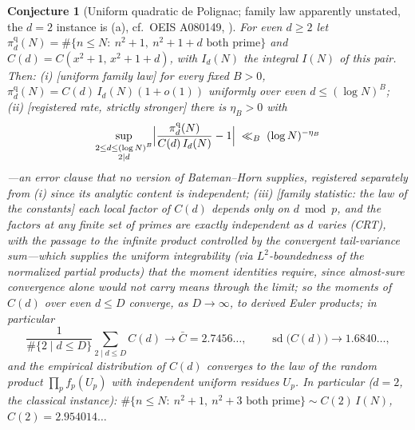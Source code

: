 \documentclass[11pt]{article}
\newtheorem{conjecture}{Conjecture}
\theoremstyle{definition}
\begin{document}
\setcounter{conjecture}{9}%
\begin{conjecture}[Uniform quadratic de Polignac; family law apparently
unstated, the $d=2$ instance is (a), cf.\ OEIS A080149,
\cite{Carella}]\label{c1}
For even $d\ge2$ let
$\pi^{\mathrm q}_d(N)=\#\{n\le N:\ n^2+1,\ n^2+1+d \text{ both
prime}\}$ and $C(d)=C(x^2+1,\,x^2+1+d)$, with $I_d(N)$ the integral $I(N)$ of this pair.  Then:
\emph{(i)} [uniform family law] for every fixed $B>0$,
$\pi^{\mathrm q}_d(N)=C(d)\,I_d(N)(1+o(1))$ uniformly over even
$d\le(\log N)^{B}$;
\emph{(ii)} [registered rate, strictly stronger] there is
$\eta_B>0$ with
\[
\sup_{\substack{2\le d\le(\log N)^{B}\\ 2\mid d}}
\Bigl|\frac{\pi^{\mathrm q}_d(N)}{C(d)\,I_d(N)}-1\Bigr|
\;\ll_B\;(\log N)^{-\eta_B}
\]
---an error clause that no version of Bateman--Horn supplies, registered
separately from (i) since its analytic content is independent;
\emph{(iii)} [family statistic: the law of the constants]
each local factor of $C(d)$ depends only on $d\bmod p$, and the
factors at any \emph{finite} set of primes are exactly independent
as $d$ varies (CRT), with the passage to the infinite product
controlled by the convergent tail-variance sum---which supplies the
uniform integrability (via $L^2$-boundedness of the normalized
partial products) that the moment identities require, since
almost-sure convergence alone would not carry means through the
limit; so the moments of
$C(d)$ over even $d\le D$ converge, as $D\to\infty$, to
\emph{derived} Euler products; in particular
\[
\frac1{\#\{2\mid d\le D\}}\sum_{2\mid d\le D}C(d)\to\bar C=2.7456\ldots,
\qquad
\operatorname{sd}\bigl(C(d)\bigr)\to1.6840\ldots,
\]
and the empirical distribution of $C(d)$ converges to the law of the
random product $\prod_p f_p(U_p)$ with independent uniform residues
$U_p$.  In particular ($d=2$, the classical instance):
$\#\{n\le N:\ n^2+1,\ n^2+3 \text{ both prime}\}\sim C(2)\,I(N)$,
$C(2)=2.954014\ldots$
\end{conjecture}
\end{document}

